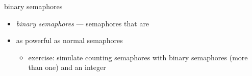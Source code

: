 \begin{frame}{binary semaphores}
    \begin{itemize}
    \item \textit{binary semaphores} --- semaphores that are 
        \vspace{.5cm}
    \item as powerful as normal semaphores
        \begin{itemize}
        \item exercise: simulate counting semaphores with binary semaphores (more than one) and an integer
        \end{itemize}
    \end{itemize}
\end{frame}

